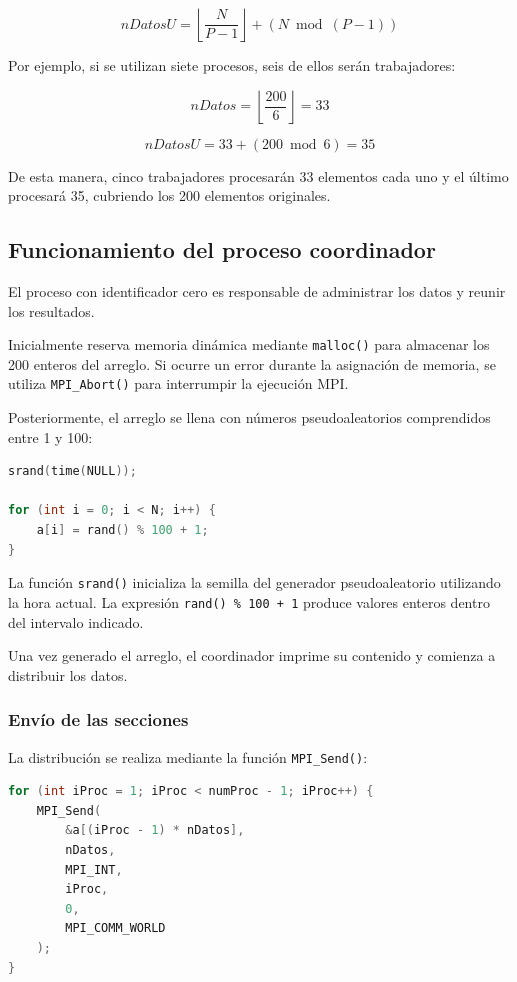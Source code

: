 \documentclass[12pt,a4paper]{article}
\begin{document}
\[
nDatosU =
\left\lfloor \frac{N}{P-1} \right\rfloor
+
\left(N \bmod (P-1)\right)
\]

Por ejemplo, si se utilizan siete procesos, seis de ellos serán trabajadores:

\[
nDatos = \left\lfloor \frac{200}{6} \right\rfloor = 33
\]

\[
nDatosU = 33 + (200 \bmod 6) = 35
\]

De esta manera, cinco trabajadores procesarán 33 elementos cada uno y el último procesará 35, cubriendo los 200 elementos originales.

\subsection{Funcionamiento del proceso coordinador}

El proceso con identificador cero es responsable de administrar los datos y reunir los resultados.

Inicialmente reserva memoria dinámica mediante \texttt{malloc()} para almacenar los 200 enteros del arreglo. Si ocurre un error durante la asignación de memoria, se utiliza \texttt{MPI\_Abort()} para interrumpir la ejecución MPI.

Posteriormente, el arreglo se llena con números pseudoaleatorios comprendidos entre 1 y 100:

\begin{lstlisting}[language=C]
srand(time(NULL));

for (int i = 0; i < N; i++) {
    a[i] = rand() % 100 + 1;
}
\end{lstlisting}

La función \texttt{srand()} inicializa la semilla del generador pseudoaleatorio utilizando la hora actual. La expresión \texttt{rand() \% 100 + 1} produce valores enteros dentro del intervalo indicado.

Una vez generado el arreglo, el coordinador imprime su contenido y comienza a distribuir los datos.

\subsubsection{Envío de las secciones}

La distribución se realiza mediante la función \texttt{MPI\_Send()}:

\begin{lstlisting}[language=C]
for (int iProc = 1; iProc < numProc - 1; iProc++) {
    MPI_Send(
        &a[(iProc - 1) * nDatos],
        nDatos,
        MPI_INT,
        iProc,
        0,
        MPI_COMM_WORLD
    );
}
\end{lstlisting}
\end{document}
